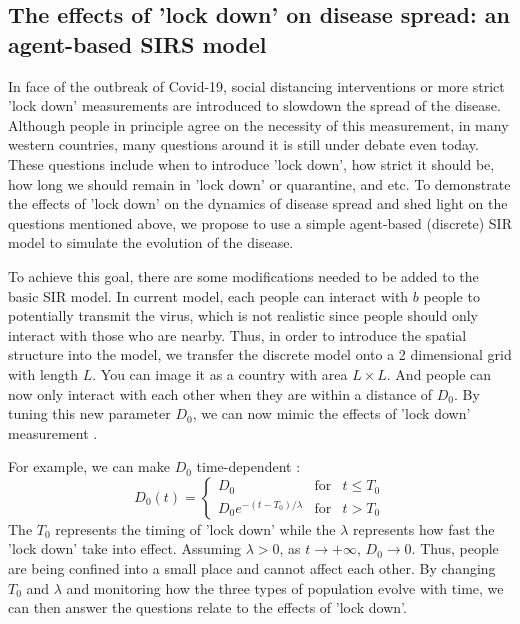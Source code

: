 \documentclass[12pt, reqno]{amsart}
\begin{document}
\subsection{The effects of 'lock down' on disease spread: an agent-based SIRS model}
In face of the outbreak of Covid-19, social distancing interventions or more strict 'lock down' measurements are introduced to slowdown the spread of the disease. Although people in principle agree on the necessity of this measurement, in many western countries, many questions around it is still under debate even today. These questions include when to introduce 'lock down', how strict it should be, how long we should remain in 'lock down' or quarantine, and etc. To demonstrate the effects of 'lock down' on the dynamics of disease spread and shed light on the questions mentioned above, we propose to use a simple agent-based (discrete) SIR model to simulate the evolution of the disease.

To achieve this goal, there are some modifications needed to be added to the basic SIR model. In current model, each people can interact with $b$ people to potentially transmit the virus, which is not realistic since people should only interact with those who are nearby. Thus, in order to introduce the spatial structure into the model, we transfer the discrete model onto a 2 dimensional grid with length $L$. You can image it as a country with area $L \times L$. And people can now only interact with each other when they are within a distance of $D_0$. By tuning this new parameter $D_0$, we can now mimic the effects of 'lock down' measurement \cite{kaxiras2020multiple}. 

For example, we can make $D_0$ time-dependent \cite{kaxiras2020multiple}:
\begin{equation}
\label{D0}
D_{0}(t)=\left\{ \begin{array}{lcl}
D_0 & \mbox{for}
& t \leq T_0  \\
D_{0}e^{-(t - T_0)/\lambda} & \mbox{for} & t > T_0
\end{array}\right.
\end{equation}
The $T_0$ represents the timing of 'lock down' while the $\lambda$ represents how fast the 'lock down' take into effect. Assuming $\lambda > 0$, as $t \to +\infty$, $D_0 \to 0$. Thus, people are being confined into a small place and cannot affect each other. By changing $T_0$ and $\lambda$ and monitoring how the three types of population evolve with time, we can then answer the questions relate to the effects of 'lock down'.
\end{document}

